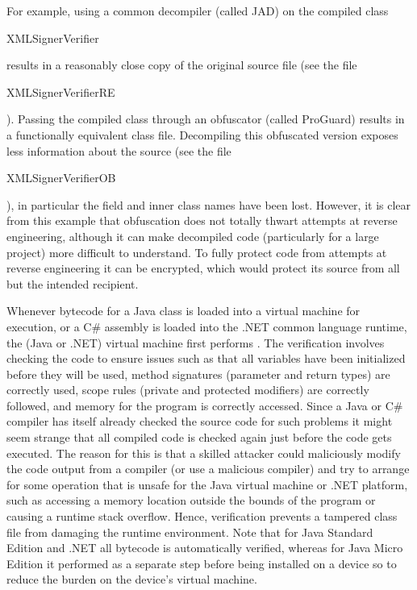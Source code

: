 For example, using a common decompiler (called JAD) on the compiled class
\begin{code}XMLSignerVerifier\end{code} %
results in a reasonably close copy of the original source file
(see the file \begin{code}XMLSignerVerifierRE\end{code}).
Passing the compiled class through an obfuscator (called ProGuard) results
in a functionally equivalent class file. Decompiling this
obfuscated version exposes less information about the source
(see the file \begin{code}XMLSignerVerifierOB\end{code}), in particular
the field and inner class names have been lost.
However, it is clear from this example that obfuscation does not totally thwart
attempts at reverse engineering,
although it can make decompiled code (particularly for a large project)
more difficult to understand. To fully protect
code from attempts at reverse engineering it can be encrypted,
which would protect its source from all but the intended recipient.

Whenever bytecode for a Java class is loaded into a virtual machine for
execution, or a C\# assembly is loaded into the .NET common language runtime,
the (Java or .NET) virtual machine first performs .
The verification involves checking the code to ensure issues
such as that all variables have been initialized before they will be used,
method signatures (parameter and return types) are correctly used,
scope rules (private and protected modifiers) are correctly followed,
and memory for the program is correctly accessed.
Since a Java or C\# compiler has itself already checked the source code for such problems
it might seem strange that all compiled code is checked again just before the code gets executed.
The reason for this is that a skilled attacker could maliciously modify the code output
from a compiler (or use a malicious compiler)
and try to arrange for some operation that is unsafe for the Java virtual machine or .NET platform,
such as accessing a memory location outside the bounds of the program or causing
a runtime stack overflow.
Hence, verification prevents a tampered class file from damaging the runtime environment.
Note that for Java Standard Edition and .NET all bytecode is automatically verified,
whereas for Java Micro Edition it performed as a separate step before being installed on
a device so to reduce the burden on the device's virtual machine.

